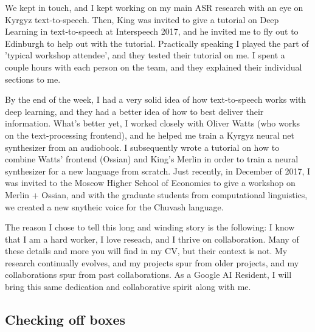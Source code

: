 \documentclass[12pt,a4paper]{article}
\begin{document}
We kept in touch, and I kept working on my main ASR research with an eye on Kyrgyz text-to-speech. Then, King was invited to give a tutorial on Deep Learning in text-to-speech at Interspeech 2017, and he invited me to fly out to Edinburgh to help out with the tutorial. Practically speaking I played the part of 'typical workshop attendee', and they tested their tutorial on me. I spent a couple hours with each person on the team, and they explained their individual sections to me.

By the end of the week, I had a very solid idea of how text-to-speech works with deep learning, and they had a better idea of how to best deliver their information. What's better yet, I worked closely with Oliver Watts (who works on the text-processing frontend), and he helped me train a Kyrgyz neural net synthesizer from an audiobook. I subsequently wrote a tutorial on how to combine Watts' frontend (Ossian) and King's Merlin in order to train a neural synthesizer for a new language from scratch. Just recently, in December of 2017, I was invited to the Moscow Higher School of Economics to give a workshop on Merlin + Ossian, and with the graduate students from computational linguistics, we created a new snytheic voice for the Chuvash language.

The reason I chose to tell this long and winding story is the following: I know that I am a hard worker, I love reseach, and I thrive on collaboration. Many of these details and more you will find in my CV, but their context is not. My research continually evolves, and my projects spur from older projects, and my collaborations spur from past collaborations. As a Google AI Resident, I will bring this same dedication and collaborative spirit along with me.

\subsection*{Checking off boxes}
\end{document}
